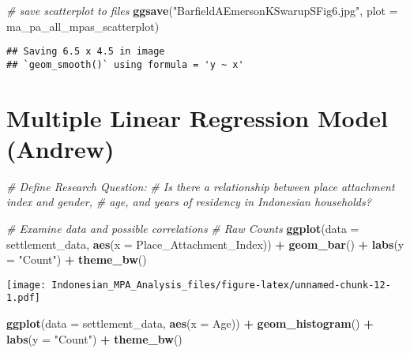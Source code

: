 \documentclass[
]{article}
\newenvironment{Shaded}{\begin{snugshade}}{\end{snugshade}}
\newcommand{\AttributeTok}[1]{\textcolor[rgb]{0.13,0.29,0.53}{#1}}
\newcommand{\CommentTok}[1]{\textcolor[rgb]{0.56,0.35,0.01}{\textit{#1}}}
\newcommand{\FunctionTok}[1]{\textcolor[rgb]{0.13,0.29,0.53}{\textbf{#1}}}
\newcommand{\NormalTok}[1]{#1}
\newcommand{\SpecialCharTok}[1]{\textcolor[rgb]{0.81,0.36,0.00}{\textbf{#1}}}
\newcommand{\StringTok}[1]{\textcolor[rgb]{0.31,0.60,0.02}{#1}}
\begin{document}
\begin{Shaded}
\begin{Highlighting}[]
\CommentTok{\# save scatterplot to files }
\FunctionTok{ggsave}\NormalTok{(}\StringTok{"BarfieldAEmersonKSwarupSFig6.jpg"}\NormalTok{, }\AttributeTok{plot =}\NormalTok{ ma\_pa\_all\_mpas\_scatterplot)}
\end{Highlighting}
\end{Shaded}

\begin{verbatim}
## Saving 6.5 x 4.5 in image
## `geom_smooth()` using formula = 'y ~ x'
\end{verbatim}

\section{Multiple Linear Regression Model
(Andrew)}\label{multiple-linear-regression-model-andrew}

\begin{Shaded}
\begin{Highlighting}[]
\CommentTok{\# Define Research Question:}
\CommentTok{\# Is there a relationship between place attachment index and gender, }
\CommentTok{\# age, and years of residency in Indonesian households?}

\CommentTok{\# Examine data and possible correlations}
\CommentTok{\# Raw Counts}
\FunctionTok{ggplot}\NormalTok{(}\AttributeTok{data =}\NormalTok{ settlement\_data, }\FunctionTok{aes}\NormalTok{(}\AttributeTok{x =}\NormalTok{ Place\_Attachment\_Index)) }\SpecialCharTok{+}
  \FunctionTok{geom\_bar}\NormalTok{() }\SpecialCharTok{+}
  \FunctionTok{labs}\NormalTok{(}\AttributeTok{y =} \StringTok{"Count"}\NormalTok{) }\SpecialCharTok{+}
  \FunctionTok{theme\_bw}\NormalTok{()}
\end{Highlighting}
\end{Shaded}

\texttt{[image: Indonesian\_MPA\_Analysis\_files/figure-latex/unnamed-chunk-12-1.pdf]}

\begin{Shaded}
\begin{Highlighting}[]
\FunctionTok{ggplot}\NormalTok{(}\AttributeTok{data =}\NormalTok{ settlement\_data, }\FunctionTok{aes}\NormalTok{(}\AttributeTok{x =}\NormalTok{ Age)) }\SpecialCharTok{+}
  \FunctionTok{geom\_histogram}\NormalTok{() }\SpecialCharTok{+}
  \FunctionTok{labs}\NormalTok{(}\AttributeTok{y =} \StringTok{"Count"}\NormalTok{) }\SpecialCharTok{+}
  \FunctionTok{theme\_bw}\NormalTok{()}
\end{Highlighting}
\end{Shaded}
\end{document}
